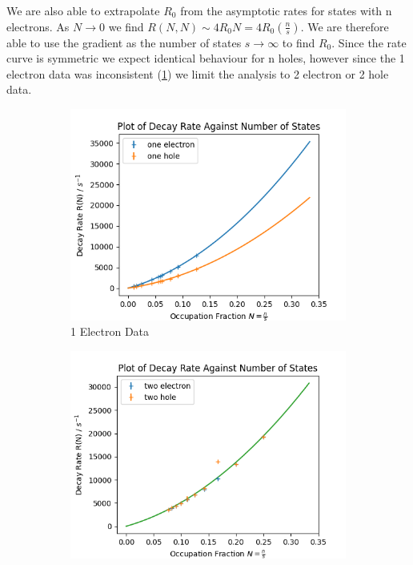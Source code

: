 We are also able to extrapolate
\(R_0\) from the asymptotic
rates for states with n electrons.
As \(N\rightarrow{}0\)
we find
\(R(N,N) \sim{} 4 R_0 N = 4R_0 (\frac{n}{s})\).
We are therefore able to
use the gradient as the
number of states \(s\rightarrow{}\infty{}\)
to find \(R_0\).
Since the rate curve
is symmetric we expect
identical behaviour for
n holes, however
since the 1 electron
data was inconsistent (\cref{sub@fig:one electron rates})
we limit the analysis to 2 electron
or 2 hole data.
\begin{figure}[htbp]
    \centering
    \begin{subfigure}{0.45\linewidth}
        \centering
        \includegraphics[width =0.9 \linewidth]{Figures/Simulation/Decay rate against occupation n=1.png}
        \caption{1 Electron Data
        }\label{sub@fig:one electron rates}
    \end{subfigure}
    \hfill
    \begin{subfigure}{0.45\linewidth}
        \centering
        \includegraphics[width = 0.9\linewidth]{Figures/Simulation/Decay rate against occupation n=2.png}

\end{subfigure}
\end{figure}
